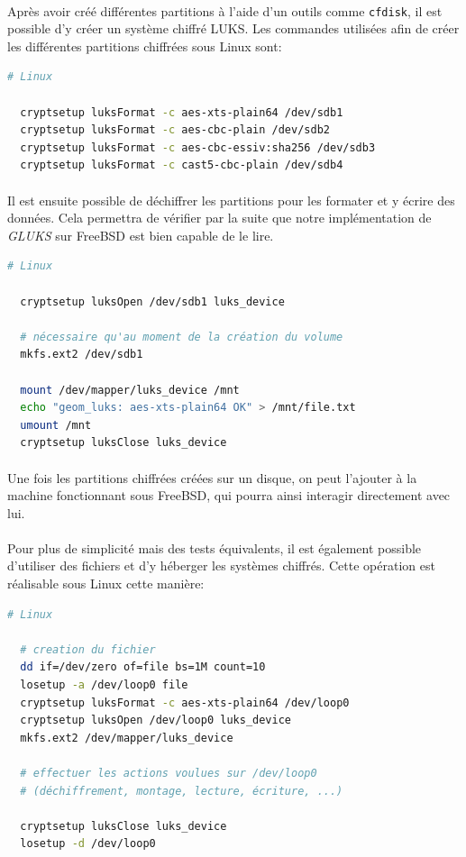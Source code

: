 \paragraph{}
Après avoir créé différentes partitions à l'aide d'un outils comme
\texttt{cfdisk}, il est possible d'y créer un système chiffré LUKS. Les
commandes utilisées afin de créer les différentes partitions chiffrées sous
Linux sont:
\\
\begin{lstlisting}[language=bash]
  # Linux
  
  cryptsetup luksFormat -c aes-xts-plain64 /dev/sdb1
  cryptsetup luksFormat -c aes-cbc-plain /dev/sdb2
  cryptsetup luksFormat -c aes-cbc-essiv:sha256 /dev/sdb3
  cryptsetup luksFormat -c cast5-cbc-plain /dev/sdb4
\end{lstlisting}
\paragraph{}
Il est ensuite possible de déchiffrer les partitions pour les formater et y
écrire des données. Cela permettra de vérifier par la suite que notre
implémentation de \textit{GLUKS} sur FreeBSD est bien capable de le lire.
\\
\begin{lstlisting}[language=bash]
  # Linux
  
  cryptsetup luksOpen /dev/sdb1 luks_device

  # nécessaire qu'au moment de la création du volume
  mkfs.ext2 /dev/sdb1
  
  mount /dev/mapper/luks_device /mnt
  echo "geom_luks: aes-xts-plain64 OK" > /mnt/file.txt
  umount /mnt
  cryptsetup luksClose luks_device
\end{lstlisting}
\paragraph{}
Une fois les partitions chiffrées créées sur un disque, on peut l'ajouter à la
machine fonctionnant sous FreeBSD, qui pourra ainsi interagir directement avec
lui.
\paragraph{}
Pour plus de simplicité mais des tests équivalents, il est également possible
d'utiliser des fichiers et d'y héberger les systèmes chiffrés. Cette opération
est réalisable sous Linux cette manière:
\\
\begin{lstlisting}[language=bash]
  # Linux
  
  # creation du fichier
  dd if=/dev/zero of=file bs=1M count=10
  losetup -a /dev/loop0 file
  cryptsetup luksFormat -c aes-xts-plain64 /dev/loop0
  cryptsetup luksOpen /dev/loop0 luks_device
  mkfs.ext2 /dev/mapper/luks_device

  # effectuer les actions voulues sur /dev/loop0
  # (déchiffrement, montage, lecture, écriture, ...)

  cryptsetup luksClose luks_device
  losetup -d /dev/loop0
\end{lstlisting}
